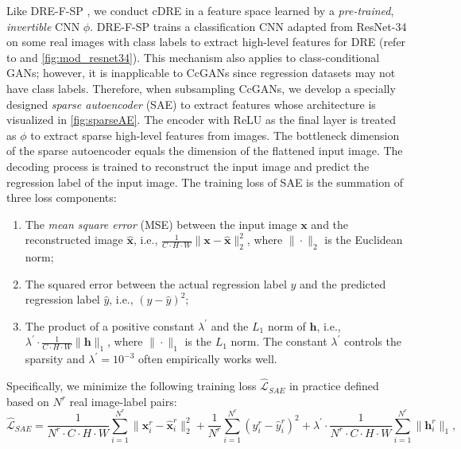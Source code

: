 \documentclass[final,12pt, 3p,times]{elsarticle}
\begin{document}
Like DRE-F-SP \cite{ding2020subsampling}, we conduct cDRE in a feature space learned by a \textit{pre-trained}, \textit{invertible} CNN $\phi$. DRE-F-SP \cite{ding2020subsampling} trains a classification CNN adapted from ResNet-34 on some real images with class labels to extract high-level features for DRE (refer to  and \cref{fig:mod_resnet34}). This mechanism also applies to class-conditional GANs; however, it is inapplicable to CcGANs since regression datasets may not have class labels. Therefore, when subsampling CcGANs, we develop a specially designed \textit{sparse autoencoder} (SAE) to extract features whose architecture is visualized in \cref{fig:sparseAE}. The encoder with ReLU \cite{glorot2011deep} as the final layer is treated as $\phi$ to extract sparse high-level features from images. The bottleneck dimension of the sparse autoencoder equals the dimension of the flattened input image. The decoding process is trained to reconstruct the input image and predict the regression label of the input image. The training loss of SAE is the summation of three loss components: 
\begin{enumerate}[(1)]
    \item The \textit{mean square error} (MSE) between the input image $\bm{x}$ and the reconstructed image $\hat{\bm{x}}$, i.e., $\frac{1}{C\cdot H\cdot W}\|\bm{x}-\hat{\bm{x}}\|^2_2$, where $\|\cdot\|_2$ is the Euclidean norm;
    
    \item The squared error between the actual regression label $y$ and the predicted regression label $\hat{y}$, i.e., $(y-\hat{y})^2$;
    
    \item The product of a positive constant $\lambda^\prime$ and the $L_1$ norm of $\bm{h}$, i.e., $\lambda^\prime\cdot\frac{1}{C\cdot H\cdot W}\|\bm{h}\|_1$, where $\|\cdot\|_1$ is the $L_1$ norm. The constant $\lambda^\prime$ controls the sparsity and $\lambda^\prime=10^{-3}$ often empirically works well.
    
\end{enumerate}
Specifically, we minimize the following training loss $\widehat{\mathcal{L}}_{SAE}$ in practice defined based on $N^r$ real image-label pairs:
\begin{equation}
    \widehat{\mathcal{L}}_{SAE} = \frac{1}{N^r\cdot C\cdot H\cdot W}\sum_{i=1}^{N^r}\|\bm{x}_i^r-\hat{\bm{x}}_i^r\|_2^2 + \frac{1}{N^r}\sum_{i=1}^{N^r}(y_i^r-\hat{y}_i^r)^2 + \lambda^\prime \cdot \frac{1}{N^r\cdot C\cdot H\cdot W}\sum_{i=1}^{N^r}\|\bm{h}^r_i\|_1,
\end{equation}
\end{document}
